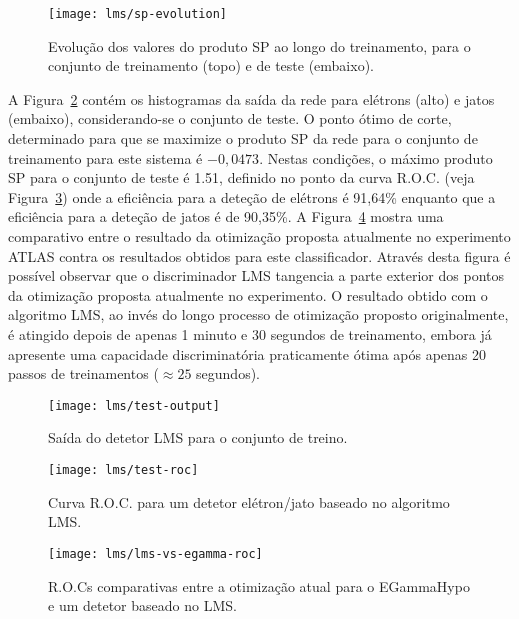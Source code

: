 \begin{figure}
\begin{center}
\texttt{[image: lms/sp-evolution]}
\end{center}
\caption{Evolução dos valores do produto SP ao longo do treinamento, para o
conjunto de treinamento (topo) e de teste (embaixo).}
\label{fig:lms-sp-evo}
\end{figure}

A Figura~\ref{fig:lms-test-output} contém os histogramas da saída da rede para
elétrons (alto) e jatos (embaixo), considerando-se o conjunto de teste. O
ponto ótimo de corte, determinado para que se maximize o produto SP da rede
para o conjunto de treinamento para este sistema é $-0,0473$. Nestas
condições, o máximo produto SP para o conjunto de teste é 1.51, definido no
ponto da curva R.O.C. (veja Figura~\ref{fig:lms-test-roc}) onde a eficiência
para a deteção de elétrons é 91,64\% enquanto que a eficiência para a deteção
de jatos é de 90,35\%. A Figura~\ref{fig:lms-vs-egamma-roc} mostra uma
comparativo entre o resultado da otimização proposta atualmente no experimento
ATLAS contra os resultados obtidos para este classificador. Através desta
figura é possível observar que o discriminador LMS tangencia a parte exterior
dos pontos da otimização proposta atualmente no experimento. O resultado
obtido com o algoritmo LMS, ao invés do longo processo de otimização proposto
originalmente, é atingido depois de apenas 1 minuto e 30 segundos de
treinamento, embora já apresente uma capacidade discriminatória praticamente
ótima após apenas 20 passos de treinamentos ($\approx 25$ segundos).

\begin{figure}
\begin{center}
\texttt{[image: lms/test-output]}
\end{center}
\caption{Saída do detetor LMS para o conjunto de treino.}
\label{fig:lms-test-output}
\end{figure}

\begin{figure}
\begin{center}
\texttt{[image: lms/test-roc]}
\end{center}
\caption{Curva R.O.C. para um detetor elétron/jato baseado no algoritmo LMS.}
\label{fig:lms-test-roc}
\end{figure}

\begin{figure}
\begin{center}
\texttt{[image: lms/lms-vs-egamma-roc]}
\end{center}
\caption{R.O.Cs comparativas entre a otimização atual para o EGammaHypo e um
detetor baseado no LMS.}
\label{fig:lms-vs-egamma-roc}
\end{figure}

